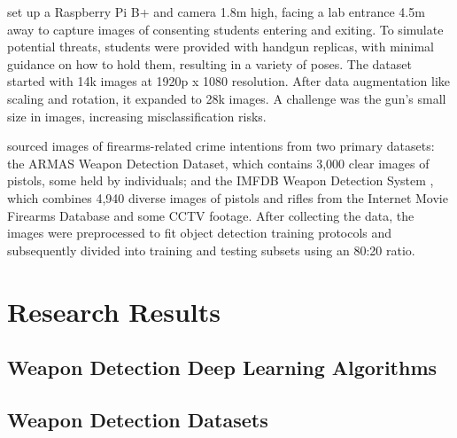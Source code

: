 \citet{rfc19} set up a Raspberry Pi B+ and camera 1.8m high, facing a lab entrance 4.5m away to capture images of consenting students entering and exiting. To simulate potential threats, students were provided with handgun replicas, with minimal guidance on how to hold them, resulting in a variety of poses. The dataset started with 14k images at 1920p x 1080 resolution. After data augmentation like scaling and rotation, it expanded to 28k images. A challenge was the gun's small size in images, increasing misclassification risks.

\citet{rfc20} sourced images of firearms-related crime intentions from two primary datasets: the ARMAS Weapon Detection Dataset, which contains 3,000 clear images of pistols, some held by individuals; and the IMFDB Weapon Detection System \cite{rfc28}, which combines 4,940 diverse images of pistols and rifles from the Internet Movie Firearms Database and some CCTV footage. After collecting the data, the images were preprocessed to fit object detection training protocols and subsequently divided into training and testing subsets using an 80:20 ratio.

\section{Research Results}
\subsection{Weapon Detection Deep Learning Algorithms}
\subsection{Weapon Detection Datasets}